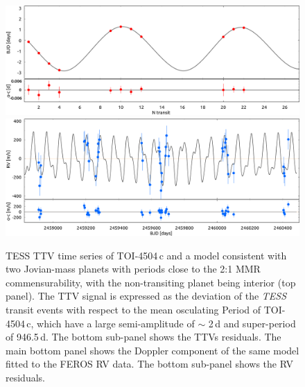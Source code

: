 \documentclass[twocolumn,twocolappendix]{aastex631}
\begin{document}
 
\begin{figure}
  \centering
  \includegraphics[width=1\linewidth]{ttv_2.png}
    \includegraphics[width=1\linewidth]{RVs.png}


  \caption{TESS TTV time series of TOI-4504\,c and a model consistent with two Jovian-mass planets with periods close to the 2:1 MMR commensurability, with the non-transiting planet being interior (top panel). The TTV signal is expressed as the deviation of the {\it TESS} transit events with respect to the mean osculating Period of TOI-4504\,c, which have a large semi-amplitude of $\sim$ 2\,d and super-period of 946.5\,d. The bottom sub-panel shows the TTVs residuals. The main bottom panel shows the Doppler component of the same model fitted to the FEROS RV data. The bottom sub-panel shows the RV residuals.}
  \label{TTVs}
\end{figure}
 
\end{document}
